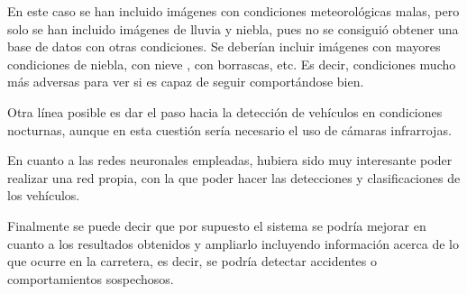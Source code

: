 En este caso se han incluido imágenes con condiciones meteorológicas malas, pero solo se han incluido imágenes de lluvia y niebla, pues no se consiguió obtener una base de datos con otras condiciones. Se deberían incluir imágenes con mayores condiciones de niebla, con nieve , con borrascas, etc. Es decir, condiciones mucho más adversas para ver si es capaz de seguir comportándose bien.

Otra línea posible es dar el paso hacia la detección de vehículos en condiciones nocturnas, aunque en esta cuestión sería necesario el uso de cámaras infrarrojas.

En cuanto a las redes neuronales empleadas, hubiera sido muy interesante poder realizar una red propia, con la que poder hacer las detecciones y clasificaciones de los vehículos.

Finalmente se puede decir que por supuesto el sistema se podría mejorar en cuanto a los resultados obtenidos y ampliarlo incluyendo información acerca de lo que ocurre en la carretera, es decir, se podría detectar accidentes o comportamientos sospechosos.



